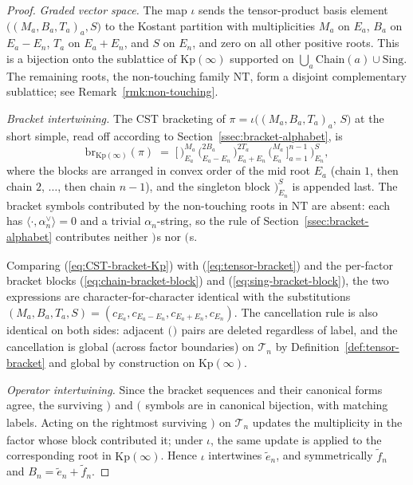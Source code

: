 \documentclass[11pt]{article}
\theoremstyle{definition}
\theoremstyle{remark}
\newcommand{\Kp}{\mathrm{Kp}}
\newcommand{\NT}{\mathrm{NT}}
\newcommand{\Sing}{\mathrm{Sing}}
\newcommand{\Chain}{\mathrm{Chain}}
\newcommand{\TT}{\mathcal{T}}
\newcommand{\br}{\mathrm{br}}
\newcommand{\labr}[1]{{)}_{#1}}
\newcommand{\labl}[1]{{(}_{#1}}
\begin{document}
\begin{proof}
\emph{Graded vector space.} The map $\iota$ sends the tensor-product basis element
$\bigl((M_a, B_a, T_a)_a, S\bigr)$ to the Kostant partition with multiplicities
$M_a$ on $E_a$, $B_a$ on $E_a - E_n$, $T_a$ on $E_a + E_n$, and $S$ on $E_n$, and
zero on all other positive roots. This is a bijection onto the sublattice of
$\Kp(\infty)$ supported on $\bigcup_a \Chain(a) \cup \Sing$. The remaining roots,
the non-touching family $\NT$, form a disjoint complementary sublattice;
see Remark~\ref{rmk:non-touching}.

\emph{Bracket intertwining.} The CST bracketing of $\pi = \iota\bigl((M_a, B_a, T_a)_a,\, S\bigr)$
at the short simple, read off according to Section~\ref{ssec:bracket-alphabet}, is
\begin{equation}\label{eq:CST-bracket-Kp}
\br_{\Kp(\infty)}(\pi) \;=\;
\bigl[\,\labr{E_a}^{M_a}\, \labl{E_a - E_n}^{2B_a}\, \labr{E_a + E_n}^{2T_a}\, \labl{E_a}^{M_a}\,\bigr]_{a=1}^{n-1}\,
\labr{E_n}^{S},
\end{equation}
where the blocks are arranged in convex order of the mid root $E_a$
(chain $1$, then chain $2$, $\ldots$, then chain $n-1$), and the singleton
block $\labr{E_n}^S$ is appended last. The bracket symbols contributed by the
non-touching roots in $\NT$ are absent: each has $\langle \cdot, \alpha_n^\vee\rangle = 0$
and a trivial $\alpha_n$-string, so the rule of Section~\ref{ssec:bracket-alphabet}
contributes neither $\labr{}$s nor $\labl{}$s.

Comparing (\ref{eq:CST-bracket-Kp}) with (\ref{eq:tensor-bracket}) and the
per-factor bracket blocks (\ref{eq:chain-bracket-block}) and
(\ref{eq:sing-bracket-block}), the two expressions are character-for-character
identical with the substitutions $(M_a, B_a, T_a, S) = (c_{E_a}, c_{E_a - E_n},
c_{E_a + E_n}, c_{E_n})$. The cancellation rule is also identical on both sides:
adjacent $\labl{}\labr{}$ pairs are deleted regardless of label, and the
cancellation is global (across factor boundaries) on $\TT_n$ by
Definition~\ref{def:tensor-bracket} and global by construction on $\Kp(\infty)$.

\emph{Operator intertwining.} Since the bracket sequences and their canonical
forms agree, the surviving $\labr{}$ and $\labl{}$ symbols are in canonical
bijection, with matching labels. Acting on the rightmost surviving $\labr{}$ on
$\TT_n$ updates the multiplicity in the factor whose block contributed it; under
$\iota$, the same update is applied to the corresponding root in $\Kp(\infty)$.
Hence $\iota$ intertwines $\tilde e_n$, and symmetrically $\tilde f_n$ and
$B_n = \tilde e_n + \tilde f_n$.
\end{proof}
\end{document}
